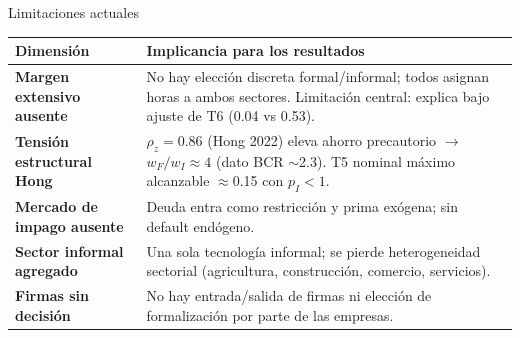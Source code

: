 \documentclass[aspectratio=169,11pt]{beamer}
\begin{document}
\begin{frame}{Limitaciones actuales}
  \small
  \renewcommand{\arraystretch}{1.18}
  \begin{tabularx}{\textwidth}{>{\bfseries}p{} X}
    \toprule
    Dimensi\'on & Implicancia para los resultados \\
    \midrule
    Margen extensivo ausente & No hay elecci\'on discreta formal/informal; todos asignan horas a ambos sectores. Limitaci\'on central: explica bajo ajuste de T6 (0.04 vs 0.53). \\
    Tensi\'on estructural Hong & $\rho_z{=}0.86$ (Hong 2022) eleva ahorro precautorio $\rightarrow$ $w_F/w_I{\approx}4$ (dato BCR $\sim$2.3). T5 nominal m\'aximo alcanzable $\approx$0.15 con $p_I{<}1$. \\
    Mercado de impago ausente & Deuda entra como restricci\'on y prima ex\'ogena; sin default end\'ogeno. \\
    Sector informal agregado & Una sola tecnolog\'ia informal; se pierde heterogeneidad sectorial (agricultura, construcci\'on, comercio, servicios). \\
    Firmas sin decisi\'on & No hay entrada/salida de firmas ni elecci\'on de formalizaci\'on por parte de las empresas. \\
    \bottomrule
  \end{tabularx}
\end{frame}
\end{document}
